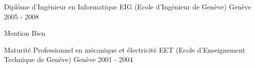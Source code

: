 
\begin{cventries}

  \cventry
    {Diplôme d'Ingénieur en Informatique}
    {EIG (Ecole d'Ingénieur de Genève)}
    {Genève}
    {2005 - 2008}
    {
      \begin{cvitems}
        \item {Mention Bien}
      \end{cvitems}
    }

  \cventry
    {Maturité Professionnel en mécanique et électricité}
    {EET (Ecole d'Enseignement Technique de Genève)}
    {Genève}
    {2001 - 2004}
    {}

\end{cventries}
